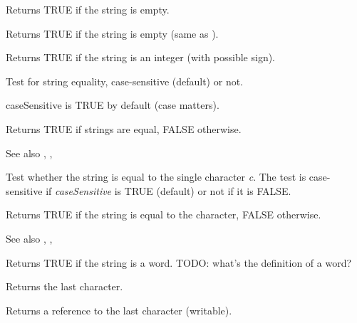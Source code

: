 Returns TRUE if the string is empty.

\label{wxstringisnull}


Returns TRUE if the string is empty (same as ).

\label{wxstringisnumber}


Returns TRUE if the string is an integer (with possible sign).

\label{wxstringissameas}


Test for string equality, case-sensitive (default) or not.

caseSensitive is TRUE by default (case matters).

Returns TRUE if strings are equal, FALSE otherwise.

See also , , 

\label{wxstringissameas2}


Test whether the string is equal to the single character {\it c}. The test is
case-sensitive if {\it caseSensitive} is TRUE (default) or not if it is FALSE.

Returns TRUE if the string is equal to the character, FALSE otherwise.

See also , , 

\label{wxstringisword}


Returns TRUE if the string is a word. TODO: what's the definition of a word?

\label{wxstringlast}


Returns the last character.


Returns a reference to the last character (writable).

